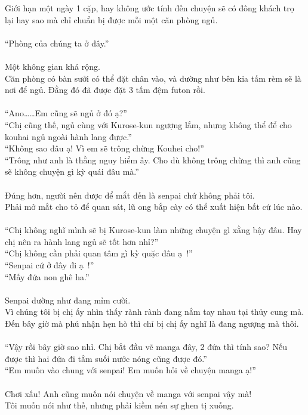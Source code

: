 \documentclass[12pt,a4paper, twosides]{book}
\begin{document}
Giới hạn một ngày 1 cặp, hay không ước tính đến chuyện sẽ có đông khách trọ lại hay sao mà chỉ chuẩn bị được mỗi một căn phòng ngủ.\\
\\
“Phòng của chúng ta ở đây.”\\
\\
Một không gian khá rộng.\\
Căn phòng có bàn sưởi có thể đặt chân vào, và dường như bên kia tấm rèm sẽ là nơi để ngủ. Đằng đó đã được đặt 3 tấm đệm futon rồi.\\
\\
“Ano……Em cũng sẽ ngủ ở đó ạ?”\\
“Chị cũng thế, ngủ cùng với Kurose-kun ngượng lắm, nhưng không thể để cho kouhai ngủ ngoài hành lang được.”\\
“Không sao đâu ạ! Vì em sẽ trông chừng Kouhei cho!”\\
“Trông như anh là thằng nguy hiểm ấy. Cho dù không trông chừng thì anh cũng sẽ không chuyện gì kỳ quái đâu mà.”\\
\\
Đúng hơn, người nên được để mắt đến là senpai chứ không phải tôi.\\
Phải mở mắt cho tỏ để quan sát, lũ ong bắp cày có thể xuất hiện bất cứ lúc nào.\\
\\
“Chị không nghĩ mình sẽ bị Kurose-kun làm những chuyện gì xằng bậy đâu. Hay chị nên ra hành lang ngủ sẽ tốt hơn nhỉ?”\\
“Chị không cần phải quan tâm gì kỳ quặc đâu ạ~!”\\
“Senpai cứ ở đây đi ạ~!”\\
“Mấy đứa non ghê ha.”\\
\\
Senpai dường như đang mỉm cười.\\
Vì chúng tôi bị chị ấy nhìn thấy rành rành đang nắm tay nhau tại thủy cung mà. Đến bây giờ mà phủ nhận hẹn hò thì chỉ bị chị ấy nghĩ là đang ngượng mà thôi.\\
\\
“Vậy rồi bây giờ sao nhỉ. Chị bắt đầu vẽ manga đây, 2 đứa thì tính sao? Nếu được thì hai đứa đi tắm suối nước nóng cũng được đó.”\\
“Em muốn vào chung với senpai! Em muốn hỏi về chuyện manga ạ!”\\
\\
Chơi xấu! Anh cũng muốn nói chuyện về manga với senpai vậy mà!\\
Tôi muốn nói như thế, nhưng phải kiềm nén sự ghen tị xuống.\\
\end{document}
